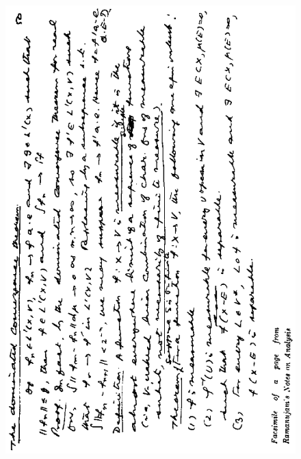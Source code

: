 \begin{figure}[H]
\centering
\includegraphics{../017.eps}
\end{figure}

\thispagestyle{empty}

\newpage
~\phantom{a}
\thispagestyle{empty}

